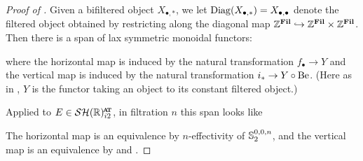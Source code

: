 \begin{proof}[Proof of ]
  Given a bifiltered object $X_{\bullet, *}$, we let $\mathrm{Diag}(X_{\bullet, *}) = X_{\bullet, \bullet}$ denote the filtered object obtained by restricting along the diagonal map $\mathbb{Z}^{\operatorname{\mathbf{Fil}}} \hookrightarrow \mathbb{Z}^{\operatorname{\mathbf{Fil}}} \times \mathbb{Z}^{\operatorname{\mathbf{Fil}}}$.
  Then there is a span of lax symmetric monoidal functors:
  \begin{center}
  \end{center}
  where the horizontal map is induced by the natural transformation $f_\bullet \to Y$ and the vertical map is induced by the natural transformation $i_* \to Y \circ \mathrm{Be}$. (Here as in , $Y$ is the functor taking an object to its constant filtered object.)

  Applied to $E \in \SHRat$, in filtration $n$ this span looks like
  \begin{center}
  \end{center}
  The horizontal map is an equivalence by $n$-effectivity of $\operatorname{\mathbb{S}}_2 ^{0,0,n}$, and the vertical map is an equivalence by  and .
\end{proof}
%
%
%
